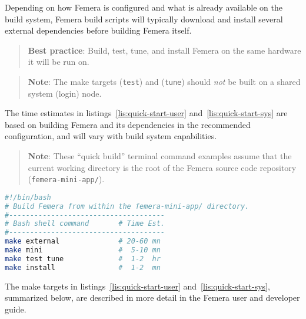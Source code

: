 Depending on how Femera is configured and what is already available
on the build system, Femera build scripts will typically download
and install several external dependencies before building Femera itself.
\begin{verse}
\textbf{Best practice}:
Build, test, tune, and install Femera on the same hardware it will be run on.
\end{verse}
\begin{comment}
tdd:tests/post-build/make\_test\_did\_check\_runtime\_fmrmodel.py
\end{comment}
\begin{verse}
\textbf{Note}:
The make targets (\texttt{test}) and (\texttt{tune})
should \textit{not} be built on a shared system (login) node.
\end{verse}
The time estimates in listings~\ref{lis:quick-start-user}
and~\ref{lis:quick-start-sys} are based
on building Femera and its dependencies in the recommended configuration,
and will vary with build system capabilities.
\begin{comment}
tdd:tests/pre-build/sys\_has\_fewer\_than\_5\_users.py
\end{comment}
\begin{verse}
\textbf{Note}:
These ``quick build'' terminal command examples
assume that the current working directory is the root of the
Femera source code repository (\texttt{femera-mini-app/}).
\end{verse}

\begin{center}
\begin{lstlisting}[caption={Build and install Femera in a user directory.},
label={lis:quick-start-user},language=bash,float=ht]
#!/bin/bash
# Build Femera from within the femera-mini-app/ directory.
#-------------------------------------
# Bash shell command       # Time Est.
#-------------------------------------
make external              # 20-60 mn
make mini                  #  5-10 mn
make test tune             #  1-2  hr
make install               #  1-2  mn
\end{lstlisting}
\begin{comment}
tdd:tests/post-build/make\_time\_in\_user\_guide\_is\_correct.py
\end{comment}
\end{center}

The make targets in
listings~\ref{lis:quick-start-user} and~\ref{lis:quick-start-sys},
summarized below, are described in more detail in
the Femera user and developer guide.

